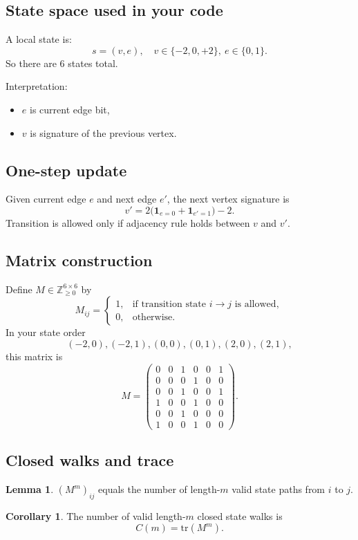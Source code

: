 \documentclass[12pt]{article}
\theoremstyle{definition}
\newtheorem{lemma}[definition]{Lemma}
\newtheorem{corollary}[definition]{Corollary}
\begin{document}
\subsection{State space used in your code}
A local state is:
\[
s=(v,e),\quad v\in\{-2,0,+2\},\ e\in\{0,1\}.
\]
So there are 6 states total.

Interpretation:
\begin{itemize}
    \item \(e\) is current edge bit,
    \item \(v\) is signature of the previous vertex.
\end{itemize}

\subsection{One-step update}
Given current edge \(e\) and next edge \(e'\), the next vertex signature is
\[
v' = 2\big(\mathbf{1}_{e=0}+\mathbf{1}_{e'=1}\big)-2.
\]
Transition is allowed only if adjacency rule holds between \(v\) and \(v'\).

\subsection{Matrix construction}
Define \(M\in\mathbb{Z}_{\ge 0}^{6\times 6}\) by
\[
M_{ij}=\begin{cases}
1,&\text{if transition state }i\to j\text{ is allowed},\\
0,&\text{otherwise.}
\end{cases}
\]
In your state order
\[
(-2,0),(-2,1),(0,0),(0,1),(2,0),(2,1),
\]
this matrix is
\[
M=
\begin{pmatrix}
0&0&1&0&0&1\\
0&0&0&1&0&0\\
0&0&1&0&0&1\\
1&0&0&1&0&0\\
0&0&1&0&0&0\\
1&0&0&1&0&0
\end{pmatrix}.
\]

\subsection{Closed walks and trace}
\begin{lemma}
\((M^m)_{ij}\) equals the number of length-\(m\) valid state paths from \(i\) to \(j\).
\end{lemma}

\begin{corollary}
The number of valid length-\(m\) closed state walks is
\[
C(m)=\mathrm{tr}(M^m).
\]
\end{corollary}
\end{document}

